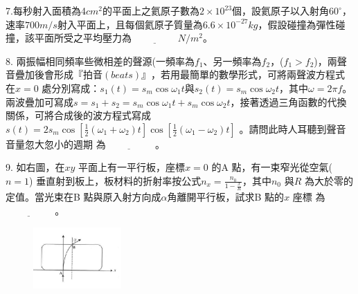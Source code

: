 \documentclass[cn,10pt,math=newtx]{elegantbook}
\begin{document}
\begin{example}
   7.每秒射入面積為4$cm^2$的平面上之氦原子數為$2\times10^23$個，設氦原子以入射角$60^\circ$，速率$700 m/s$射入平面上，且每個氦原子質量為$6.6\times10^{-27}kg$，假設碰撞為彈性碰撞，該平面所受之平均壓力為$\underline{\hspace{2cm}} N/m^2$。\\
    \rightline{[中壢高中教甄109]}
\end{example}
\begin{solution}
    
\end{solution}

\newpage

\begin{example}
   8. 兩振幅相同頻率些微相差的聲源(一頻率為$f_1$、另一頻率為$f_2$，($f_1 > f_2$)，兩聲音疊加後會形成$『拍音(beats)』$，若用最簡單的數學形式，可將兩聲波方程式在$x=0$ 處分別寫成：$s_1 (t) = s_m \cos{\omega_1 t}$與$s_2 (t) = s_m \cos{\omega_2 t}$，其中$\omega = 2\pi f$。兩波疊加可寫成$s = s_1 + s_2 =s_m \cos{\omega_1 t}+ s_m \cos{\omega_2 t} $，接著透過三角函數的代換關係，可將合成後的波方程式寫成$s(t) = 2s_m \cos{[\frac{1}{2}(\omega_1+\omega_2) t]} \cos{[\frac{1}{2}(\omega_1-\omega_2) t]}$
。請問此時人耳聽到聲音音量忽大忽小的週期
為$\underline{\hspace{2cm}}$ 。\\
    \rightline{[中壢高中教甄109]}
\end{example}
\begin{solution}
    
\end{solution}

\newpage


\begin{example}
   9. 如右圖，在$xy$ 平面上有一平行板，座標$x=0$ 的A 點，有一束窄光從空氣($n=1$)
垂直射到板上，板材料的折射率按公式$n_x = \frac{n_0}{1-\frac{x}{R}}$，其中$n_0$ 與$R$ 為大於零的定值。當光束在B 點與原入射方向成$\alpha$角離開平行板，試求B 點的$x$ 座標
為$\underline{\hspace{2cm}}$ 。\\
    \rightline{[中壢高中教甄109]}
\end{example}
\begin{solution}
    
\end{solution}
\begin{figure}[htbp]
    \flushright
    \includegraphics[width=0.3\textwidth]{image/109中壢9.png}
  \end{figure}
\newpage
\end{document}
